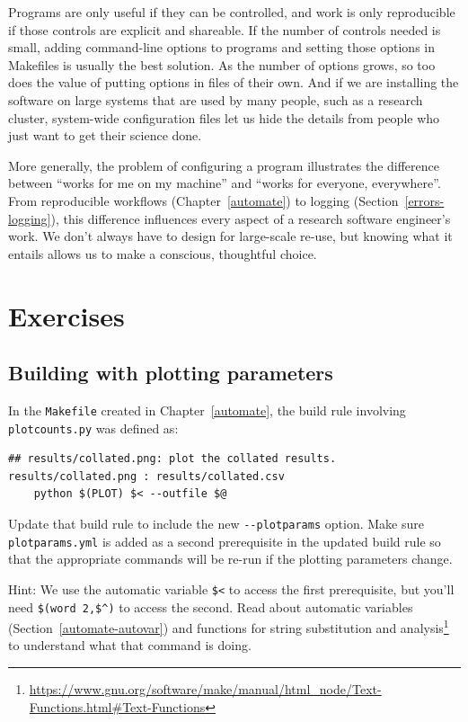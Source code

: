 \documentclass[
]{krantz}
\renewcommand{\href}[2]{#2\footnote{\url{#1}}}
\begin{document}
Programs are only useful if they can be controlled,
and work is only reproducible if those controls are explicit and shareable.
If the number of controls needed is small,
adding command-line options to programs and setting those options in Makefiles
is usually the best solution.
As the number of options grows,
so too does the value of putting options in files of their own.
And if we are installing the software on large systems that are used by many people,
such as a research cluster,
system-wide configuration files let us hide the details
from people who just want to get their science done.

More generally,
the problem of configuring a program illustrates the difference
between ``works for me on my machine''
and ``works for everyone, everywhere''.
From reproducible workflows (Chapter~\ref{automate}) to logging (Section~\ref{errors-logging}),
this difference influences every aspect of a research software engineer's work.
We don't always have to design for large-scale re-use,
but knowing what it entails allows us to make a conscious, thoughtful choice.

\hypertarget{config-exercises}{%
\section{Exercises}\label{config-exercises}}

\hypertarget{config-ex-build-plotparams}{%
\subsection{Building with plotting parameters}\label{config-ex-build-plotparams}}

In the \texttt{Makefile} created in Chapter~\ref{automate},
the build rule involving \texttt{plotcounts.py} was defined as:

\begin{verbatim}
## results/collated.png: plot the collated results.
results/collated.png : results/collated.csv
    python $(PLOT) $< --outfile $@
\end{verbatim}

Update that build rule to include the new \texttt{-\/-plotparams} option.
Make sure \texttt{plotparams.yml} is added as a second prerequisite in the updated build rule
so that the appropriate commands will be re-run if the plotting parameters change.

Hint: We use the automatic variable \texttt{\$\textless{}} to access the first prerequisite,
but you'll need \texttt{\$(word\ 2,\$\^{})} to access the second.
Read about automatic variables (Section~\ref{automate-autovar}) and
\href{https://www.gnu.org/software/make/manual/html_node/Text-Functions.html\#Text-Functions}{functions for string substitution and analysis}
to understand what that command is doing.
\end{document}
